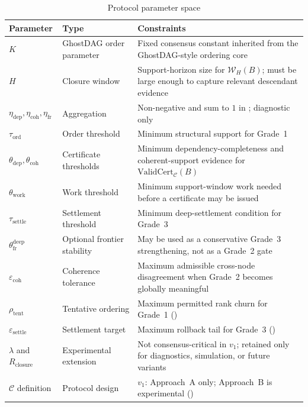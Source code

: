 \documentclass[11pt]{article}
\theoremstyle{definition}
\theoremstyle{plain}
\theoremstyle{remark}
\newcommand{\Clvl}{\mathcal{C}}          %
\newcommand{\Rcls}{R_{\mathrm{closure}}} %
\begin{document}
\begin{table}[tbp]
\centering
\caption{Protocol parameter space}
\label{tab:params}
\small
\renewcommand{\arraystretch}{1.1}
\begin{tabularx}{0.98\textwidth}{@{}L{2.7cm}L{2.6cm}Y@{}}
\toprule
\textbf{Parameter} & \textbf{Type} & \textbf{Constraints} \\
\midrule
$K$ & GhostDAG order parameter & Fixed consensus constant inherited from the
GhostDAG-style ordering core \\
$H$ & Closure window & Support-horizon size for $\mathcal{W}_H(B)$;
must be large enough to capture relevant descendant evidence \\
$\eta_{\mathrm{dep}}, \eta_{\mathrm{coh}}, \eta_{\mathrm{fr}}$ & Aggregation &
Non-negative and sum to $1$ in ; diagnostic only \\
$\tau_{\mathrm{ord}}$ & Order threshold & Minimum structural support for Grade~1 \\
$\theta_{\mathrm{dep}}, \theta_{\mathrm{coh}}$ & Certificate thresholds &
Minimum dependency-completeness and coherent-support evidence for
$\mathrm{ValidCert}_{\mathcal{C}}(B)$ \\
$\theta_{\mathrm{work}}$ & Work threshold & Minimum support-window work needed
before a certificate may be issued \\
$\tau_{\mathrm{settle}}$ & Settlement threshold & Minimum deep-settlement
condition for Grade~3 \\
$\theta^{\mathrm{deep}}_{\mathrm{fr}}$ & Optional frontier stability & May be
used as a conservative Grade~3 strengthening, not as a Grade~2 gate \\
$\varepsilon_{\mathrm{coh}}$ & Coherence tolerance & Maximum admissible
cross-node disagreement when Grade~2 becomes globally meaningful \\
$\rho_{\mathrm{tent}}$ & Tentative ordering & Maximum permitted rank churn for
Grade~1 () \\
$\varepsilon_{\mathrm{settle}}$ & Settlement target & Maximum rollback tail for
Grade~3 () \\
$\lambda$ and $\Rcls$ & Experimental extension & Not consensus-critical in
$v_1$; retained only for diagnostics, simulation, or future variants \\
$\Clvl$ definition & Protocol design & $v_1$: Approach~A only; Approach~B is
experimental () \\
\bottomrule
\end{tabularx}
\end{table}
\end{document}
